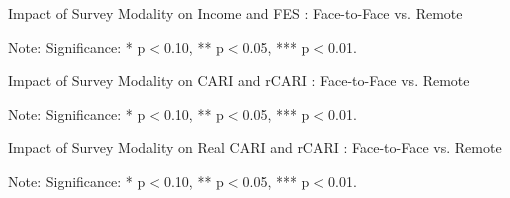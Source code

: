 \documentclass[11pt,harvard]{article}
\begin{document}
\begin{table}[htbp]
	\centering
	\begin{adjustbox}{max width=\textwidth}
		\begin{threeparttable}
			\caption{Impact of Survey Modality on Income and FES : Face-to-Face vs. Remote}
			\scriptsize
			 
			\label{tab:Myanmar_IncFes_Modality_Balance}
			\begin{tablenotes}
				\item Note: Significance: * p$<$0.10, ** p$<$0.05, *** p$<$0.01. 
			\end{tablenotes}
		\end{threeparttable}
	\end{adjustbox}
\end{table}


\begin{table}[htbp]
	\centering
	\begin{adjustbox}{max width=\textwidth}
		\begin{threeparttable}
			\caption{Impact of Survey Modality on CARI and rCARI : Face-to-Face vs. Remote}
			\scriptsize
			 
			\label{tab:Myanmar_CARI_Modality_Balance}
			\begin{tablenotes}
				\item Note: Significance: * p$<$0.10, ** p$<$0.05, *** p$<$0.01. 
			\end{tablenotes}
		\end{threeparttable}
	\end{adjustbox}
\end{table}

\begin{table}[htbp]
	\centering
	\begin{adjustbox}{max width=\textwidth}
		\begin{threeparttable}
			\caption{Impact of Survey Modality on Real CARI and rCARI : Face-to-Face vs. Remote}
			\scriptsize
			 
			\label{tab:Myanmar_CARI_Modality_Balance_Key}
			\begin{tablenotes}
				\item Note: Significance: * p$<$0.10, ** p$<$0.05, *** p$<$0.01. 
			\end{tablenotes}
		\end{threeparttable}
	\end{adjustbox}
\end{table}
\end{document}
